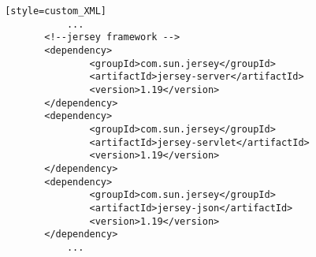 \begin{lstlisting} [style=custom_XML]
			...
		<!--jersey framework -->
		<dependency>
				<groupId>com.sun.jersey</groupId>
				<artifactId>jersey-server</artifactId>
				<version>1.19</version>
		</dependency>
		<dependency>
				<groupId>com.sun.jersey</groupId>
				<artifactId>jersey-servlet</artifactId>
				<version>1.19</version>
		</dependency>
		<dependency>
				<groupId>com.sun.jersey</groupId>
				<artifactId>jersey-json</artifactId>
				<version>1.19</version>
		</dependency>
			...
\end{lstlisting}